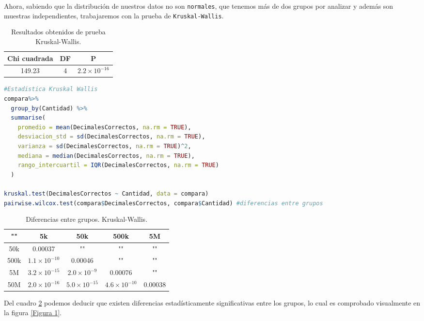 \documentclass{article}
\begin{document}
Ahora, sabiendo que la distribuci\'on de nuestros datos no son \texttt{normales}, que tenemos m\'as de dos grupos por analizar y adem\'as son muestras independientes, trabajaremos con la prueba de \texttt{Kruskal-Wallis}\cite{SeleccionPruebas}.

\begin{table}[ht]
    \centering
    \caption{Resultados obtenidos de prueba Kruskal-Wallis.} 
    \begin{tabular}{|c|c|c|}
    \hline
    Chi cuadrada & DF & P  \\
    \hline
    149.23 & 4 & $2.2\times 10^{-16}$ \\
    \hline
\end{tabular}
    \label{cuadro 2}
\end{table}

\begin{lstlisting}[language=R, caption= C\'odigo prueba estad\'istica Kruskal-Wallis.]
#Estadistica Kruskal Wallis
compara%>%
  group_by(Cantidad) %>%
  summarise(
    promedio = mean(DecimalesCorrectos, na.rm = TRUE),
    desviacion_std = sd(DecimalesCorrectos, na.rm = TRUE),
    varianza = sd(DecimalesCorrectos, na.rm = TRUE)^2,
    mediana = median(DecimalesCorrectos, na.rm = TRUE),
    rango_intercuartil = IQR(DecimalesCorrectos, na.rm = TRUE)
  )

kruskal.test(DecimalesCorrectos ~ Cantidad, data = compara)
pairwise.wilcox.test(compara$DecimalesCorrectos, compara$Cantidad) #diferencias entre grupos
\end{lstlisting}

\begin{table}[ht]
    \centering
    \caption{Diferencias entre grupos. Kruskal-Wallis.} 
    \begin{tabular}{|c|c|c|c|c|}
    \hline
    "" & 5k & 50k & 500k & 5M \\
    \hline
    50k & 0.00037 & "" & "" & "" \\
    \hline
    500k & $1.1\times 10^{-10}$ & 0.00046 & "" & "" \\
    \hline
    5M & $3.2\times 10^{-15}$ & $2.0\times 10^{-9}$ & 0.00076 & "" \\
    \hline
    50M & $2.0\times 10^{-16}$ & $5.0\times 10^{-15}$ & $4.6\times 10^{-10}$ & 0.00038 \\
    \hline
\end{tabular}
    \label{cuadro 3}
\end{table}

Del cuadro \ref{cuadro 3} podemos deducir que existen diferencias estad\'isticamente significativas entre los grupos, lo cual es comprobado visualmente en la figura \ref{Figura 1}.
\end{document}
